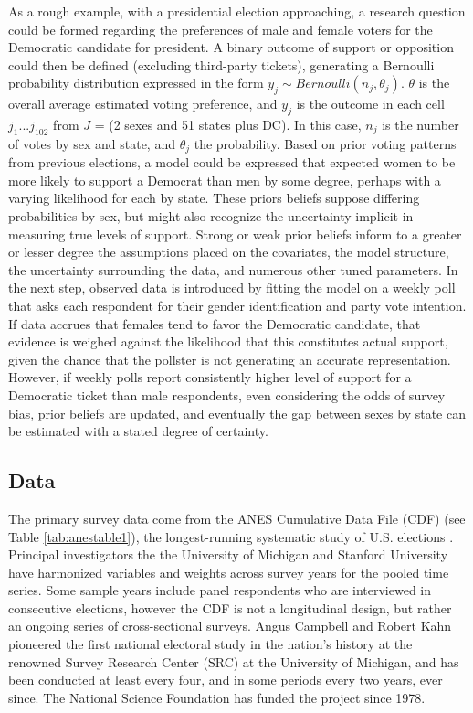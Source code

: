 As a rough example, with a presidential election approaching, a research question could be formed regarding the preferences of male and female voters for the Democratic candidate for president. A binary outcome of support or opposition could then be defined (excluding third-party tickets), generating a Bernoulli probability distribution expressed in the form ${y}_{j}\sim Bernoulli\left(n_j,{\theta}_{j}\right)$. ${\theta}$ is the overall average estimated voting preference, and $y_j$ is the outcome in each cell $j_{1}...j_{102}$ from $J$ = (2 sexes and 51 states plus DC). In this case, $n_j$ is the number of votes by sex and state, and ${\theta}_{j}$ the probability. Based on prior voting patterns from previous elections, a model could be expressed that expected women to be more likely to support a Democrat than men by some degree, perhaps with a varying likelihood for each by state. These priors beliefs suppose differing probabilities by sex, but might also recognize the uncertainty implicit in measuring true levels of support. Strong or weak prior beliefs inform to a greater or lesser degree the assumptions placed on the covariates, the model structure, the uncertainty surrounding the data, and numerous other tuned parameters. In the next step, observed data is introduced by fitting the model on a weekly poll that asks each respondent for their gender identification and party vote intention. If data accrues that females tend to favor the Democratic candidate, that evidence is weighed against the likelihood that this constitutes actual support, given the chance that the pollster is not generating an accurate representation. However, if weekly polls report consistently higher level of support for a Democratic ticket than male respondents, even considering the odds of survey bias, prior beliefs are updated, and eventually the gap between sexes by state can be estimated with a stated degree of certainty.

\subsection{Data}\label{sec:anesracechapter}

The primary survey data come from the ANES Cumulative Data File (CDF) (see Table \ref{tab:anestable1}), the longest-running systematic study of U.S. elections \citep{brader_american_2021}. Principal investigators the the University of Michigan and Stanford University have harmonized variables and weights across survey years for the pooled time series. Some sample years include panel respondents who are interviewed in consecutive elections, however the CDF is not a longitudinal design, but rather an ongoing series of cross-sectional surveys. Angus Campbell and Robert Kahn pioneered the first national electoral study in the nation's history at the renowned Survey Research Center (SRC) at the University of Michigan, and has been conducted at least every four, and in some periods every two years, ever since. The National Science Foundation has funded the project since 1978.   

